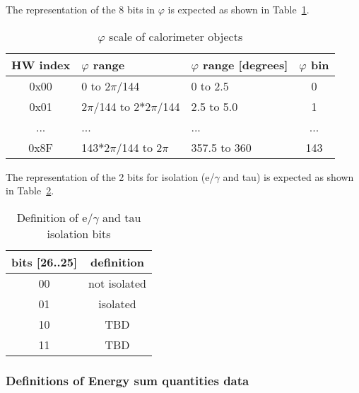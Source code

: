 The representation of the 8 bits in $\varphi$ is expected as shown in Table~\ref{tab:gtl:calo_phi_scale}.\\

\begin{table}[ht]
\caption{$\varphi$ scale of calorimeter objects}
\vspace{5mm}
\centering
\begin{tabular}{|c|l|l|c|}\hline
HW index & $\varphi$ range & $\varphi$ range [degrees] & $\varphi$ bin\\\hline\hline
0x00 & 0 to 2$\pi$/144 & 0 to 2.5 & 0\\\hline
0x01 & 2$\pi$/144 to 2$*$2$\pi$/144 & 2.5 to 5.0 & 1\\\hline
... & ... & ... & ...\\\hline
0x8F & 143$*$2$\pi$/144 to 2$\pi$ & 357.5 to 360 & 143\\\hline
\end{tabular}
\label{tab:gtl:calo_phi_scale}
\end{table}

The representation of the 2 bits for isolation (e/$\gamma$ and tau) is expected as shown in Table~\ref{tab:gtl:eg_tau_iso_bits}.\\

\begin{table}[ht]
\caption{Definition of e/$\gamma$ and tau isolation bits}
\vspace{5mm}
\centering
\begin{tabular}{|c|c|}\hline
bits [26..25] & definition \\\hline\hline
00 & not isolated \\
01 & isolated \\
10 & TBD \\
11 & TBD \\\hline
\end{tabular}
\label{tab:gtl:eg_tau_iso_bits}
\end{table}

\clearpage

\subsubsection{Definitions of Energy sum quantities data}

